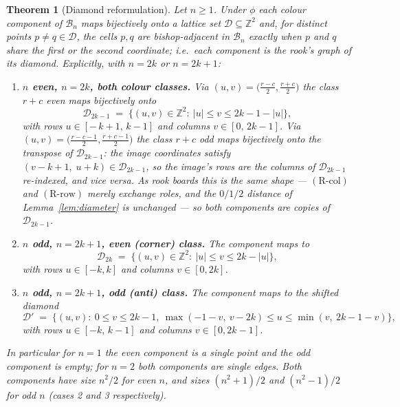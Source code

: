 \documentclass[12pt]{article}
\newtheorem{theorem}{Theorem}
\theoremstyle{definition}
\newcommand{\BB}{\mathcal{B}}
\newcommand{\DD}{\mathcal{D}}
\newcommand{\DDs}{\mathcal{D}'}
\newcommand{\Z}{\mathbb{Z}}
\newcommand{\RRc}{\ensuremath{\mathrm{(R\text{-}col)}}}
\newcommand{\RRr}{\ensuremath{\mathrm{(R\text{-}row)}}}
\begin{document}
\begin{theorem}[Diamond reformulation]\label{thm:reform}
Let $n\ge1$. Under $\phi$ each colour component of $\BB_n$ maps bijectively onto a lattice set $\DD\subseteq\Z^2$ and, for distinct points $p\neq q\in\DD$, the cells $p,q$ are bishop-adjacent in $\BB_n$ exactly when $p$ and $q$ share the first or the second coordinate; i.e.\ \emph{each component is the rook's graph of its diamond}. Explicitly, with $n=2k$ or $n=2k+1$:
\begin{enumerate}[label=(\arabic*),leftmargin=16mm]
\item \textbf{$n$ even, $n=2k$, both colour classes.} Via $(u,v)=\bigl(\frac{r-c}2,\frac{r+c}2\bigr)$ the class $r+c$ even maps bijectively onto
\[
\DD_{2k-1} \;=\; \{(u,v)\in\Z^2:\ |u|\le v\le 2k-1-|u|\},
\]
with rows $u\in[-\,k{+}1,\,k{-}1]$ and columns $v\in[0,\,2k-1]$. Via $(u,v)=\bigl(\frac{r-c-1}2,\frac{r+c-1}2\bigr)$ the class $r+c$ odd maps bijectively onto the transpose of $\DD_{2k-1}$: the image coordinates satisfy $(v-k+1,\;u+k)\in\DD_{2k-1}$, so the image's rows are the columns of $\DD_{2k-1}$ re-indexed, and vice versa. As rook boards this is the same shape — \RRc{} and \RRr{} merely exchange roles, and the $0/1/2$ distance of Lemma~\ref{lem:diameter} is unchanged — so both components are copies of $\DD_{2k-1}$.
\item \textbf{$n$ odd, $n=2k+1$, even (corner) class.} The component maps to
\[
\DD_{2k}\;=\;\{(u,v)\in\Z^2:\ |u|\le v\le 2k-|u|\},
\]
with rows $u\in[-k,k]$ and columns $v\in[0,2k]$.
\item \textbf{$n$ odd, $n=2k+1$, odd (anti) class.} The component maps to the shifted diamond
\[
\DDs \;=\;\Big\{(u,v):\ 0\le v\le 2k-1,\ \max(-1-v,\ v-2k)\le u\le \min(v,\ 2k-1-v)\Big\},
\]
with rows $u\in[-k,\,k-1]$ and columns $v\in[0,2k-1]$.
\end{enumerate}
In particular for $n=1$ the even component is a single point and the odd component is empty; for $n=2$ both components are single edges. Both components have size $n^2/2$ for even $n$, and sizes $(n^2{+}1)/2$ and $(n^2{-}1)/2$ for odd $n$ (cases 2 and 3 respectively).
\end{theorem}
\end{document}
